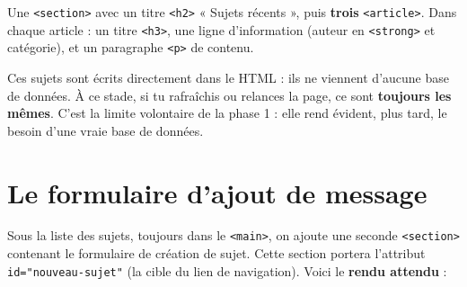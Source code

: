 \documentclass[a4paper,11pt]{article}
\begin{document}
\begin{tcolorbox}[definition, title={À produire}]
Une \texttt{<section>} avec un titre \texttt{<h2>} « Sujets récents », puis \textbf{trois} \texttt{<article>}. Dans chaque article : un titre \texttt{<h3>}, une ligne d'information (auteur en \texttt{<strong>} et catégorie), et un paragraphe \texttt{<p>} de contenu.
\end{tcolorbox}

\begin{tcolorbox}[attention, title={« Codé en dur » --- pourquoi ?}]
Ces sujets sont écrits directement dans le HTML : ils ne viennent d'aucune base de données. À ce stade, si tu rafraîchis ou relances la page, ce sont \textbf{toujours les mêmes}. C'est la limite volontaire de la phase 1 : elle rend évident, plus tard, le besoin d'une vraie base de données.
\end{tcolorbox}

\section{Le formulaire d'ajout de message}

Sous la liste des sujets, toujours dans le \texttt{<main>}, on ajoute une seconde \texttt{<section>} contenant le formulaire de création de sujet. Cette section portera l'attribut \texttt{id="nouveau-sujet"} (la cible du lien de navigation). Voici le \textbf{rendu attendu} :
\end{document}
